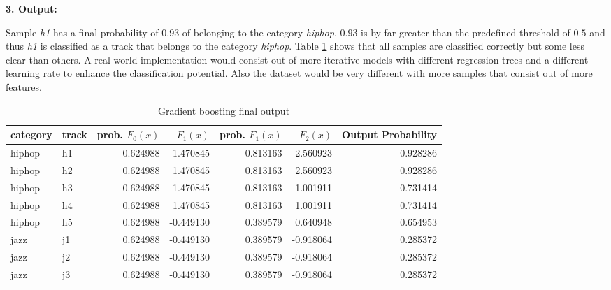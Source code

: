 \textbf{3. Output:}

Sample \emph{h1} has a final probability of \(0.93\) of belonging to the category \emph{hiphop}. \(0.93\) is by far greater than the 
predefined threshold of \(0.5\) and thus \emph{h1} is classified as a track that belongs to the category \emph{hiphop}. Table \ref{tbl:theory_gb_final_output} shows
that all samples are classified correctly but some less clear than others. A real-world implementation would consist 
out of more iterative models with different regression trees and a different learning rate to enhance the 
classification potential. Also the dataset would be very different with more samples that consist out of more features. 

\begin{table}[H]
    \centering
    \begin{tabular}{llrrrrr}
        \toprule
        category & track &  prob. \(F_{0}(x)\) &    \(F_{1}(x)\) &  prob. \(F_{1}(x)\) &       \(F_{2}(x)\) &  Output Probability \\
        \midrule
          hiphop &    h1 &         0.624988 &  1.470845 &         0.813163 &  2.560923 &                          0.928286 \\
          hiphop &    h2 &         0.624988 &  1.470845 &         0.813163 &  2.560923 &                          0.928286 \\
          hiphop &    h3 &         0.624988 &  1.470845 &         0.813163 &  1.001911 &                          0.731414 \\
          hiphop &    h4 &         0.624988 &  1.470845 &         0.813163 &  1.001911 &                          0.731414 \\
          hiphop &    h5 &         0.624988 & -0.449130 &         0.389579 &  0.640948 &                          0.654953 \\
            jazz &    j1 &         0.624988 & -0.449130 &         0.389579 & -0.918064 &                          0.285372 \\
            jazz &    j2 &         0.624988 & -0.449130 &         0.389579 & -0.918064 &                          0.285372 \\
            jazz &    j3 &         0.624988 & -0.449130 &         0.389579 & -0.918064 &                          0.285372 \\
        \bottomrule
        \end{tabular}           
    \caption{Gradient boosting final output}%
    \label{tbl:theory_gb_final_output}%
  \end{table} 

